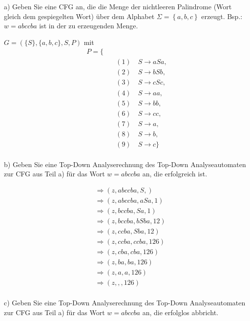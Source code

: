 \documentclass{article}
\begin{document}
a) Geben Sie eine CFG an, die die Menge der nichtleeren Palindrome (Wort gleich dem gespiegelten Wort) über dem Alphabet $\Sigma = \left\{a, b, c\right\}$ erzeugt. Bsp.: $w=abccba$ ist in der zu erzeugenden Menge.

$G = (\{S\}, \{a, b, c\}, S, P)$ mit
\begin{equation}
\begin{split}
P = \{ \\\
&\quad (1) \quad S \rightarrow aSa, \\\ 
&\quad (2) \quad S \rightarrow bSb, \\\
&\quad (3) \quad S \rightarrow cSc, \\\
&\quad (4) \quad S \rightarrow aa, \\\
&\quad (5) \quad S \rightarrow bb, \\\
&\quad (6) \quad S \rightarrow cc, \\\
&\quad (7) \quad S \rightarrow a, \\\
&\quad (8) \quad S \rightarrow b, \\\
&\quad (9) \quad S \rightarrow c \} \\\
\end{split}
\end{equation}

b) Geben Sie eine Top-Down Analyserechnung des Top-Down Analyseautomaten zur CFG aus Teil a) für das Wort $w=abccba$ an, die erfolgreich ist.

\begin{equation}
\begin{split}
&\Rightarrow(z, abccba, S, ) \\\ 
&\Rightarrow(z, abccba, aSa, 1) \\\ 
&\Rightarrow(z, bccba, Sa, 1) \\\ 
&\Rightarrow(z, bccba, bSba, 1 2) \\\ 
&\Rightarrow(z, ccba, Sba, 1 2) \\\
&\Rightarrow(z, ccba, ccba, 1 2 6) \\\
&\Rightarrow(z, cba, cba, 1 2 6) \\\
&\Rightarrow(z, ba, ba, 1 2 6) \\\
&\Rightarrow(z, a, a, 1 2 6) \\\
&\Rightarrow(z, , , 1 2 6) \\\
\end{split}
\end{equation}


c) Geben Sie eine Top-Down Analyserechnung des Top-Down Analyseautomaten zur CFG aus Teil a) für das Wort $w=abccba$ an, die erfolglos abbricht.
\end{document}
